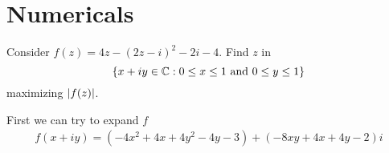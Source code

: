 \documentclass{homework}
\begin{document}
                  \section{Numericals}

                  \begin{problem}\label{max-modulus-numerical}
                    Consider $f(z) = 4z - (2z - i)^2 - 2i - 4$.  Find $z$ in 
                      \[
                          \{ x + iy \in \mathbb{C} : 0 \leq x \leq 1 \mbox{ and } 0 \leq y \leq 1 \}
                            \]
                              maximizing $\left|f(z)\right|$.
                              \end{problem}
                              \begin{solution}
                              First we can try to expand $f$
                              \begin{align*}
                              f(x+ iy) = (-4 x^2 + 4 x + 4 y^2 - 4y - 3) + (-8 x y +  4 x + 4y - 2)i
                              \end{align*}


\end{solution}
\end{document}
